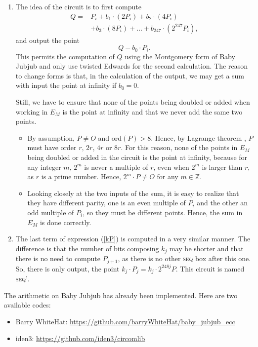 \documentclass{article}
\newcommand{\Z}{\ensuremath{\mathbb{Z}}}
\theoremstyle{definition}
\theoremstyle{remark}
\begin{document}
\begin{spacing}{1.2}
\begin{multicols}{2}
\begin{enumerate}
	\item The idea of the circuit is to first compute %
			\begin{align*}
				Q =	& P_i + b_1 \cdot (2P_i) + b_2 \cdot (4P_i) \\
					&+ b_3 \cdot (8P_i) + \dots + b_{247} \cdot (2^{247}P_i),
			\end{align*}
	and output the point
		$$ Q - b_0 \cdot P_i. $$
	This permits the computation of $Q$ using the Montgomery form of Baby Jubjub and only use twisted Edwards for the second calculation. The reason to change forms is that, in the calculation of the output, we may get a sum with input the point at infinity if $b_0 = 0$. 
	
	Still, we have to ensure that none of the points being doubled or added when working in $E_M$ is the point at infinity and that we never add the same two points. 
	
	\begin{itemize}
		\item By assumption, $P\not= O$ and ord$(P)>8$. Hence, by Lagrange theorem {\cite[Corollary 4.12]{lagrange}}, $P$ must have order $r$, $2r$, $4r$ or $8r$. 
		For this reason, none of the points in $E_M$ being doubled or added in the circuit is the point at infinity, because for any integer $m$,  $2^m$ is never a multiple of $r$, even when $2^m$ is larger than $r$, as $r$ is a prime number. Hence, $2^m \cdot P \not= O$ for any $m\in\Z$.		
		
		\item Looking closely at the two inputs of the sum, it is easy to realize that they have different parity, one is an even multiple of $P_i$ and the other an odd multiple of $P_i$, so they must be different points. Hence, the sum in $E_M$ is done correctly.
	\end{itemize}
	
	\item The last term of expression (\ref{kP}) is computed in a very similar manner. The difference is that the number of bits composing $k_j$ may be shorter and that there is no need to compute $P_{j+1}$, as there is no other \textsc{seq} box after this one. So, there is only output, the point $k_j \cdot P_j = k_j\cdot 2^{248j} P$. This circuit is named \textsc{seq'}.

\end{enumerate}


\noindent The arithmetic on Baby Jubjub has already been implemented. Here are two available codes:
	\begin{itemize}
		\item Barry WhiteHat:
		\url{https://github.com/barryWhiteHat/baby_jubjub_ecc}
		\item iden3:
		\url{https://github.com/iden3/circomlib} 
	\end{itemize}


\end{multicols}
\end{spacing}
\end{document}
